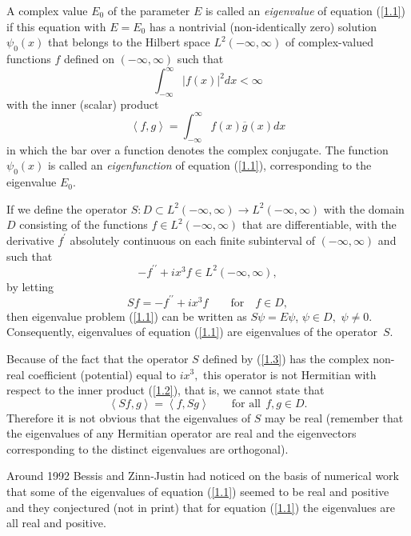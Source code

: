 \documentclass[pdftex]{sigma}
\numberwithin{equation}{section}
\begin{document}
A complex value $E_{0}$ of the parameter $E$ is called an \textit{eigenvalue}
of equation (\ref{1.1}) if this equation with $E=E_{0}$ has a nontrivial
(non-identically zero) solution $\psi _{0}(x)$ that belongs to the Hilbert
space $L^{2}(-\infty ,\infty )$ of complex-valued functions $f$ def\/ined on $%
(-\infty ,\infty )$ such that%
\[
\int_{-\infty }^{\infty }\left\vert f(x)\right\vert ^{2}dx<\infty
\]%
with the inner (scalar) product%
\begin{equation}
\left\langle f,g\right\rangle =\int_{-\infty }^{\infty }f(x)\overline{g}(x)dx
\label{1.2}
\end{equation}%
in which the bar over a function denotes the complex conjugate. The function
$\psi _{0}(x)$ is called an \textit{eigenfunction} of equation (\ref{1.1}),
corresponding to the eigenvalue $E_{0}.$

If we def\/ine the operator $S:D\subset L^{2}(-\infty ,\infty )\rightarrow
L^{2}(-\infty ,\infty )$ with the domain $D$ consisting of the functions $%
f\in L^{2}(-\infty ,\infty )$ that are dif\/ferentiable, with the derivative $%
f^{\prime }$ absolutely continuous on each f\/inite subinterval of $(-\infty
,\infty )$ and such that%
\[
-f^{\prime \prime }+ix^{3}f\in L^{2}(-\infty ,\infty ),
\]%
by letting%
\begin{equation}
Sf=-f^{\prime \prime }+ix^{3}f\qquad \text{for} \quad f\in D,  \label{1.3}
\end{equation}%
then eigenvalue problem (\ref{1.1}) can be written as $S\psi =E\psi $, $\psi
\in D,$ $\psi \neq 0.$ Consequently, eigenvalues of equation (\ref{1.1}) are
eigenvalues of the operator~$S$.

Because of the fact that the operator $S$ def\/ined by (\ref{1.3}) has the
complex non-real coef\/f\/icient (potential) equal to $ix^{3},$ this operator is
not Hermitian with respect to the inner product (\ref{1.2}), that is, we
cannot state that%
\[
\left\langle Sf,g\right\rangle =\left\langle f,Sg\right\rangle \qquad \text{for all} \ \ f,g\in D.
\]%
Therefore it is not obvious that the eigenvalues of $S$ may be real
(remember that the eigenvalues of any Hermitian operator are real and the
eigenvectors corresponding to the distinct eigenvalues are orthogonal).

Around 1992 Bessis and Zinn-Justin had noticed on the basis of numerical
work that some of the eigenvalues of equation (\ref{1.1}) seemed to be real
and positive and they conjectured (not in print) that for equation (\ref{1.1}) the eigenvalues are all real and positive.
\end{document}
